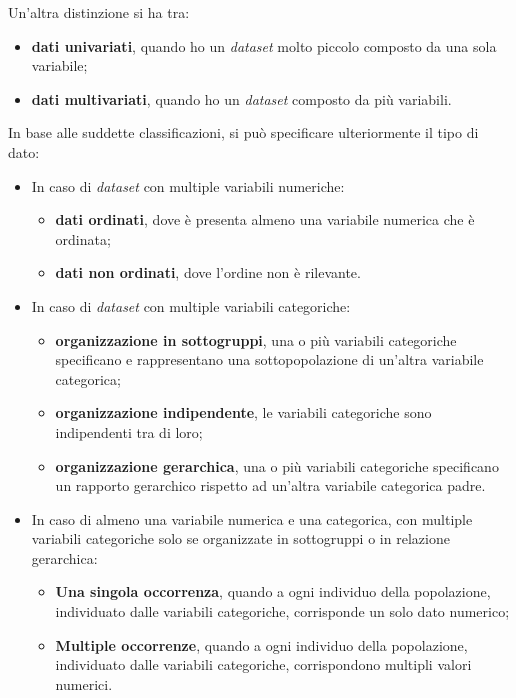 \bigskip
\noindent Un'altra distinzione si ha tra:
\begin{itemize}
    \item \textbf{dati univariati}, quando ho un \emph{dataset} molto piccolo composto da una sola variabile;
    \item \textbf{dati multivariati}, quando ho un \emph{dataset} composto da più variabili.
\end{itemize}

\bigskip
\noindent In base alle suddette classificazioni, si può specificare ulteriormente il tipo di dato:
\begin{itemize}
    \item In caso di \emph{dataset} con multiple variabili numeriche:
    \begin{itemize}
        \item \textbf{dati ordinati}, dove è presenta almeno una variabile numerica che è ordinata;
        \item \textbf{dati non ordinati}, dove l'ordine non è rilevante.
    \end{itemize}
    \item In caso di \emph{dataset} con multiple variabili categoriche:
    \begin{itemize}
        \item \textbf{organizzazione in sottogruppi}, una o più variabili categoriche specificano e rappresentano una sottopopolazione di un'altra variabile categorica;
        \item \textbf{organizzazione indipendente}, le variabili categoriche sono indipendenti tra di loro;
        \item \textbf{organizzazione gerarchica}, una o più variabili categoriche specificano un rapporto gerarchico rispetto ad un'altra variabile categorica padre.
    \end{itemize}
    \item In caso di almeno una variabile numerica e una categorica, con multiple variabili categoriche solo se organizzate in sottogruppi o in relazione gerarchica:
    \begin{itemize}
        \item \textbf{Una singola occorrenza}, quando a ogni individuo della popolazione, individuato dalle variabili categoriche, corrisponde un solo dato numerico;
        \item \textbf{Multiple occorrenze}, quando a ogni individuo della popolazione, individuato dalle variabili categoriche, corrispondono multipli valori numerici.
    \end{itemize}
\end{itemize}


